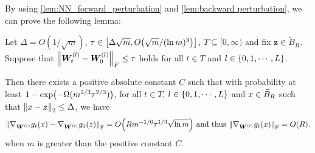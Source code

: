 By using \cref{lem:NN_forward_perturbation} and \cref{lem:backward perturbation}, we can prove the following lemma:
\begin{lemma}
  \label{lem:Training_GradientBound}
  Let $\Delta=O(1/\sqrt{m})$, $\tau\in\zk{\Delta\sqrt{m},O\xkm{{\sqrt{m}}/{(\ln m)^3}}}$, $T\subseteq [0,\infty)$ and fix ${\bm{z}} \in\tilde{B}_R$.
  Suppose that $\norm{\bm{W}^{(l)}_t - \bm{W}^{(l)}_0 }_{F}\leq\tau$ holds for all $t\in T$ and $l\in\left\{0,1,\cdots,L\right\}$.
  
  Then there exists a positive absolute constant $C$ such that with probability at least $1-\exp\xkm{-\Omega(m^{2/3}\tau^{2/3})}$, for all $t\in T$, $l\in\left\{0,1,\cdots,L\right\}$ and $x\in\tilde{B}_R$ such that $\norm{x-\bm{z}}_2\leq \Delta$, we have
  \begin{align*}
    \norm{\nabla_{\bm{W}^{(l)}} g_t(\x) - \nabla_{\bm{W}^{(l)}} g_0(\z)}_{\mr{F}} = O\xkm{R m^{-1/6} \tau^{1/3}\sqrt{\ln m}}~\text{and thus}~\norm{ \nabla_{\bm{W}^{(l)}} g_t(\x)}_{\mr{F}} = O(R).
  \end{align*}
  when $m$ is greater than the positive constant $C$.
\end{lemma}
